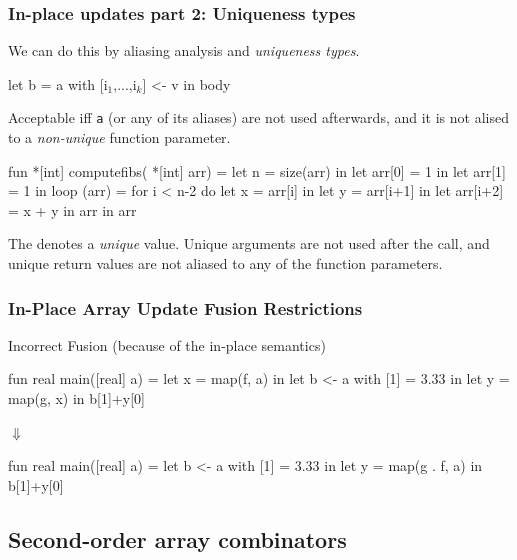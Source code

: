 \documentclass{beamer}
\newcommand{\emp}[1]{\textcolor{DikuRed}{ #1}}
\newcommand{\mymath}[1]{$ #1 $}
\newcommand{\myindx}[1]{_{#1}}
\begin{document}
\begin{frame}[fragile,t]
  \frametitle{In-place updates part 2: Uniqueness types}

  We can do this by aliasing analysis and {\em uniqueness types}.

  \begin{colorcode}
    let b = a with [i\mymath{\myindx{1}},...,i\mymath{\myindx{k}}] <- v
    in body
  \end{colorcode}

  Acceptable iff {\tt a} (or any of its aliases) are not used
  afterwards, and it is not alised to a {\it non-unique} function
  parameter.

  \begin{colorcode}
    fun \emp{*}[int] computefibs(\emp{*}[int] arr) =
      let n = size(arr) in
      let arr[0] = 1 in
      let arr[1] = 1 in
      loop (arr) = for i < n-2 do
        let x = arr[i] in
        let y = arr[i+1] in
        let arr[i+2] = x + y in
        arr
      in arr
  \end{colorcode}

  The {\tt *} denotes a {\em unique} value.  Unique arguments are not
  used after the call, and unique return values are not aliased to any
  of the function parameters.

\end{frame}

\begin{frame}[fragile,t]
  \frametitle{In-Place Array Update Fusion Restrictions}

  \begin{block}{Incorrect Fusion (because of the in-place semantics)}
    \begin{center}
      \begin{colorcode}[fontsize=\scriptsize]
fun real main([real] a) =
let x      = map(f, a)   in
let b <- a with [1] = 3.33 in
let y      = map(g, x)     in
b[1]+y[0]
      \end{colorcode}
      $\Downarrow$
      \begin{colorcode}[fontsize=\scriptsize]
fun real main([real] a) =
let b <- a with [1] = 3.33   in
let y      = map(g . f, a) in
b[1]+y[0]
      \end{colorcode}
    \end{center}
  \end{block}
\end{frame}

\subsection{Second-order array combinators}
\end{document}
